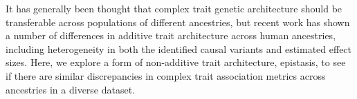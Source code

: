 \documentclass[12pt,a4paper]{article}
\begin{document}
It has generally been thought that complex trait genetic architecture should be transferable across populations of different ancestries, but recent work has shown a number of differences in additive trait architecture across human ancestries, including heterogeneity in both the identified causal variants and estimated effect sizes. Here, we explore a form of non-additive trait architecture, epistasis, to see if there are similar discrepancies in complex trait association metrics across ancestries in a diverse dataset.

\fi
\end{document}
